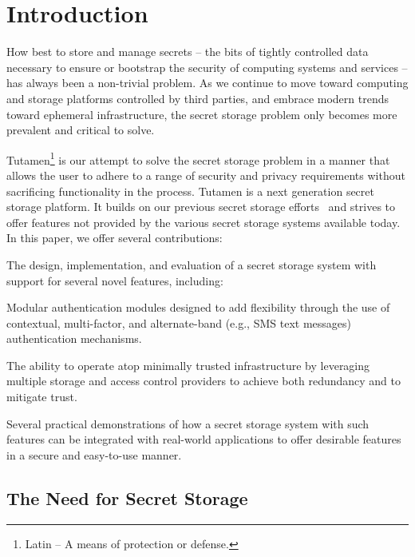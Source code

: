 \section{Introduction}
\label{sec:intro}

How best to store and manage secrets -- the bits of tightly controlled
data necessary to ensure or bootstrap the security of computing
systems and services -- has always been a non-trivial problem. As we
continue to move toward computing and storage platforms controlled by
third parties, and embrace modern trends toward ephemeral
infrastructure, the secret storage problem only becomes more prevalent
and critical to solve.

Tutamen\footnote{Latin -- A means of protection or defense.} is our
attempt to solve the secret storage problem in a manner that allows
the user to adhere to a range of security and privacy requirements
without sacrificing functionality in the process. Tutamen is a next
generation secret storage platform. It builds on our previous secret
storage efforts~\cite{custos-trios} and strives to offer features not
provided by the various secret storage systems available today. In
this paper, we offer several contributions:

\begin{packed_item}
\item The design, implementation, and evaluation of a secret storage
  system with support for several novel features, including:
  \begin{packed_item}
  \item Modular authentication modules designed to add flexibility
    through the use of contextual, multi-factor, and alternate-band
    (e.g., SMS text messages) authentication mechanisms.
  \item The ability to operate atop minimally trusted infrastructure
    by leveraging multiple storage and access control providers to
    achieve both redundancy and to mitigate trust.
  \end{packed_item}
\item Several practical demonstrations of how a secret storage system
  with such features can be integrated with real-world applications to
  offer desirable features in a secure and easy-to-use manner.
\end{packed_item}

\subsection{The Need for Secret Storage}

